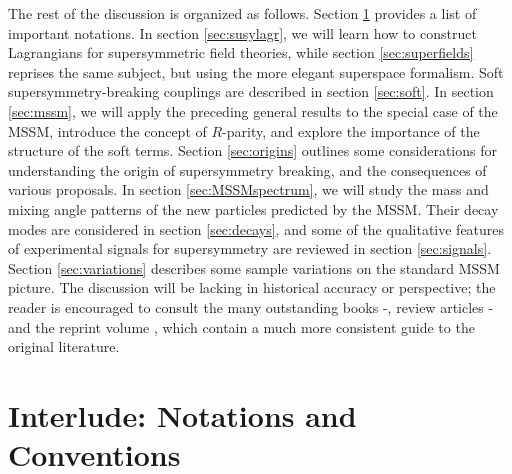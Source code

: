 \documentclass[11pt]{article}
\begin{document}
The rest of the discussion is organized as follows. Section
\ref{sec:notations} provides a list of important notations. In section
\ref{sec:susylagr}, we will learn how to construct Lagrangians for
supersymmetric field theories, while section \ref{sec:superfields} 
reprises the same subject, but using the more elegant superspace formalism.
Soft supersymmetry-breaking couplings are
described in section \ref{sec:soft}. In section \ref{sec:mssm}, we will
apply the preceding general results to the special case of the MSSM,
introduce the concept of $R$-parity, and explore the importance of the
structure of the soft terms. Section \ref{sec:origins} outlines some
considerations for understanding the origin of supersymmetry breaking, and
the consequences of various proposals. In section \ref{sec:MSSMspectrum},
we will study the mass and mixing angle patterns of the new particles
predicted by the MSSM. Their decay modes are considered in section
\ref{sec:decays}, and some of the qualitative features of experimental
signals for supersymmetry are reviewed in section \ref{sec:signals}.
Section \ref{sec:variations} describes some sample variations on the
standard MSSM picture. The discussion will be lacking in historical
accuracy or perspective; the reader is
encouraged to consult the many outstanding books
\cite{WessBaggerbook}-\cite{Shifman:2012zz}, 
review articles
\cite{HaberKanereview}-\cite{Bertolini:2013via} 
and the reprint volume
\cite{reprints}, which contain a much more consistent guide to the
original literature. 


\section{Interlude: Notations and Conventions}\label{sec:notations}
\setcounter{equation}{0}
\setcounter{figure}{0}
\setcounter{table}{0}
\setcounter{footnote}{1}
\end{document}
